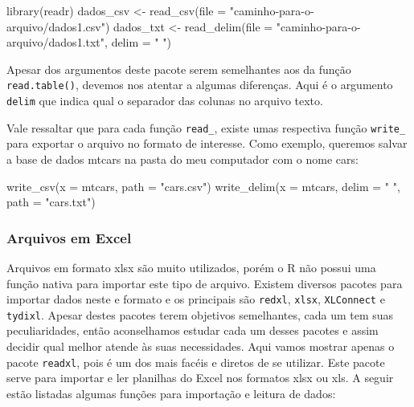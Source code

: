 \documentclass[
  letterpaper,
  DIV=11,
  numbers=noendperiod]{scrreprt}
\newenvironment{Shaded}{\begin{snugshade}}{\end{snugshade}}
\newcommand{\AttributeTok}[1]{\textcolor[rgb]{0.40,0.45,0.13}{#1}}
\newcommand{\FunctionTok}[1]{\textcolor[rgb]{0.28,0.35,0.67}{#1}}
\newcommand{\NormalTok}[1]{\textcolor[rgb]{0.00,0.23,0.31}{#1}}
\newcommand{\OtherTok}[1]{\textcolor[rgb]{0.00,0.23,0.31}{#1}}
\newcommand{\StringTok}[1]{\textcolor[rgb]{0.13,0.47,0.30}{#1}}
\begin{document}
\begin{Shaded}
\begin{Highlighting}[]
\FunctionTok{library}\NormalTok{(readr)}
\NormalTok{dados\_csv }\OtherTok{\textless{}{-}} \FunctionTok{read\_csv}\NormalTok{(}\AttributeTok{file =} \StringTok{"caminho{-}para{-}o{-}arquivo/dados1.csv"}\NormalTok{)}
\NormalTok{dados\_txt }\OtherTok{\textless{}{-}} \FunctionTok{read\_delim}\NormalTok{(}\AttributeTok{file =} \StringTok{"caminho{-}para{-}o{-}arquivo/dados1.txt"}\NormalTok{, }\AttributeTok{delim =} \StringTok{" "}\NormalTok{)}
\end{Highlighting}
\end{Shaded}

Apesar dos argumentos deste pacote serem semelhantes aos da função
\texttt{read.table()}, devemos nos atentar a algumas diferenças. Aqui é
o argumento \texttt{delim} que indica qual o separador das colunas no
arquivo texto.

Vale ressaltar que para cada função \texttt{read\_}, existe umas
respectiva função \texttt{write\_} para exportar o arquivo no formato de
interesse. Como exemplo, queremos salvar a base de dados mtcars na pasta
do meu computador com o nome cars:

\begin{Shaded}
\begin{Highlighting}[]
\FunctionTok{write\_csv}\NormalTok{(}\AttributeTok{x =}\NormalTok{ mtcars, }\AttributeTok{path =} \StringTok{"cars.csv"}\NormalTok{)}
\FunctionTok{write\_delim}\NormalTok{(}\AttributeTok{x =}\NormalTok{ mtcars, }\AttributeTok{delim =} \StringTok{" "}\NormalTok{, }\AttributeTok{path =} \StringTok{"cars.txt"}\NormalTok{)}
\end{Highlighting}
\end{Shaded}

\hypertarget{arquivos-em-excel}{%
\subsubsection{Arquivos em Excel}\label{arquivos-em-excel}}

Arquivos em formato xlsx são muito utilizados, porém o R não possui uma
função nativa para importar este tipo de arquivo. Existem diversos
pacotes para importar dados neste e formato e os principais são
\texttt{redxl}, \texttt{xlsx}, \texttt{XLConnect} e \texttt{tydixl}.
Apesar destes pacotes terem objetivos semelhantes, cada um tem suas
peculiaridades, então aconselhamos estudar cada um desses pacotes e
assim decidir qual melhor atende às suas necessidades. Aqui vamos
mostrar apenas o pacote \texttt{readxl}, pois é um dos mais facéis e
diretos de se utilizar. Este pacote serve para importar e ler planilhas
do Excel nos formatos xlsx ou xls. A seguir estão listadas algumas
funções para importação e leitura de dados:
\end{document}
